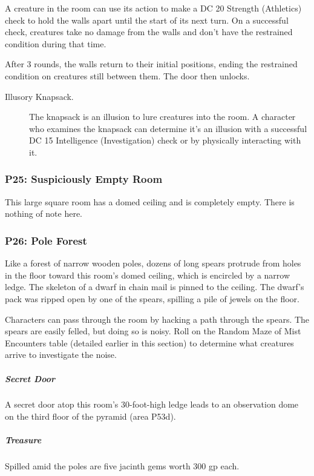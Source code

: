 \documentclass[10pt,a4paper,twoside,bg=print,twocolumn,openany,nodeprecatedcode]{dndbook}
\begin{document}
A creature in the room can use its action to make a DC 20 Strength (Athletics) check to hold the walls apart until the start of its next turn. On a successful check, creatures take no damage from the walls and don't have the restrained condition during that time.

After 3 rounds, the walls return to their initial positions, ending the restrained condition on creatures still between them. The door then unlocks.


\begin{description}
\item[Illusory Knapsack.]
The knapsack is an illusion to lure creatures into the room. A character who examines the knapsack can determine it's an illusion with a successful DC 15 Intelligence (Investigation) check or by physically interacting with it.
\end{description}

\subsubsection{P25: Suspiciously Empty Room}
This large square room has a domed ceiling and is completely empty. There is nothing of note here.

\subsubsection{P26: Pole Forest}
\begin{DndReadAloud}{}
Like a forest of narrow wooden poles, dozens of long spears protrude from holes in the floor toward this room's domed ceiling, which is encircled by a narrow ledge. The skeleton of a dwarf in chain mail is pinned to the ceiling. The dwarf's pack was ripped open by one of the spears, spilling a pile of jewels on the floor.

\end{DndReadAloud}

Characters can pass through the room by hacking a path through the spears. The spears are easily felled, but doing so is noisy. Roll on the Random Maze of Mist Encounters table (detailed earlier in this section) to determine what creatures arrive to investigate the noise.

\subparagraph{Secret Door}
A secret door atop this room's 30-foot-high ledge leads to an observation dome on the third floor of the pyramid (area P53d).

\subparagraph{Treasure}
Spilled amid the poles are five jacinth gems worth 300 gp each.
\end{document}
